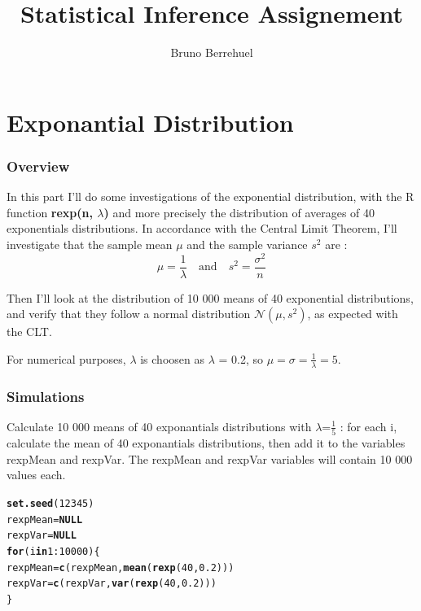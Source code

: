 \documentclass[a4paper, 10pt]{article}\usepackage[]{graphicx}\usepackage[]{color}
\makeatletter
\newcommand{\hlnum}[1]{\textcolor[rgb]{0.686,0.059,0.569}{#1}}%
\newcommand{\hlopt}[1]{\textcolor[rgb]{0,0,0}{#1}}%
\newcommand{\hlstd}[1]{\textcolor[rgb]{0.345,0.345,0.345}{#1}}%
\newcommand{\hlkwa}[1]{\textcolor[rgb]{0.161,0.373,0.58}{\textbf{#1}}}%
\newcommand{\hlkwb}[1]{\textcolor[rgb]{0.69,0.353,0.396}{#1}}%
\newcommand{\hlkwd}[1]{\textcolor[rgb]{0.737,0.353,0.396}{\textbf{#1}}}%
\newenvironment{kframe}{%
 \def\at@end@of@kframe{}%
 \ifinner\ifhmode%
  \def\at@end@of@kframe{\end{minipage}}%
  \begin{minipage}{\columnwidth}%
 \fi\fi%
 \def\FrameCommand##1{\hskip\@totalleftmargin \hskip-\fboxsep
 \colorbox{shadecolor}{##1}\hskip-\fboxsep
     \hskip-\linewidth \hskip-\@totalleftmargin \hskip\columnwidth}%
 \MakeFramed {\advance\hsize-\width
   \@totalleftmargin\z@ \linewidth\hsize
   \@setminipage}}%
 {\par\unskip\endMakeFramed%
 \at@end@of@kframe}
\newenvironment{knitrout}{}{} %
\makeatother
\begin{document}
\title{Statistical Inference Assignement}
\author{Bruno Berrehuel}

\maketitle
\hrulefill{}
\tableofcontents

\makeatletter
{}
\makeatother

\newpage
\part{Exponantial Distribution}
\section{Overview}

In this part I'll do some investigations of the exponential distribution, with the R function \textbf{rexp(n, $\lambda$)} and more precisely the distribution of averages of 40 exponentials distributions.
In accordance with the Central Limit Theorem, I'll investigate that the sample mean $\mu$ and the sample variance $s^2$ are :
\begin{displaymath}
    \mu = \frac{1}{\lambda} \quad\mbox{and}\quad s^2 = \frac{\sigma^2}{n}
\end{displaymath}

Then I'll look at the distribution of 10 000 means of 40 exponential distributions, and verify that they follow a  normal distribution $\mathcal{N}(\mu,s^2)$, as expected with the CLT.

\noindent
For numerical purposes, $\lambda$ is choosen as $\lambda$ = 0.2, so $\mu = \sigma = \frac{1}{\lambda} = 5$.

\section{Simulations}

Calculate 10 000 means of 40 exponantials distributions with $\lambda$=$\frac{1}{5}$ : for each i, calculate the mean of 40 exponantials distributions, then add it to the variables rexpMean and rexpVar. The rexpMean and rexpVar variables will contain 10 000 values each.

\begin{knitrout}\small
{}\color{fgcolor}\begin{kframe}
\begin{alltt}
\hlkwd{set.seed}\hlstd{(}\hlnum{12345}\hlstd{)}
\hlstd{rexpMean}\hlkwb{=}\hlkwa{NULL}
\hlstd{rexpVar}\hlkwb{=}\hlkwa{NULL}
\hlkwa{for} \hlstd{(i} \hlkwa{in} \hlnum{1}\hlopt{:}\hlnum{10000}\hlstd{) \{}
    \hlstd{rexpMean} \hlkwb{=} \hlkwd{c}\hlstd{(rexpMean,} \hlkwd{mean}\hlstd{(}\hlkwd{rexp}\hlstd{(}\hlnum{40}\hlstd{,}\hlnum{0.2}\hlstd{)))}
    \hlstd{rexpVar} \hlkwb{=} \hlkwd{c}\hlstd{(rexpVar,} \hlkwd{var}\hlstd{(}\hlkwd{rexp}\hlstd{(}\hlnum{40}\hlstd{,}\hlnum{0.2}\hlstd{)))}
\hlstd{\}}
\end{alltt}
\end{kframe}
\end{knitrout}
\end{document}
